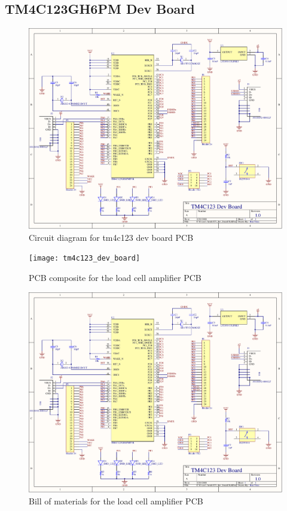 \begin{flushleft}
\section{TM4C123GH6PM Dev Board}
\end{flushleft}
\label{app:tm4c_dev_board}
\begin{figure}[H]
	\centering
	\includegraphics[page=1,scale=0.8,angle=270]{PDFs/tm4c123_dev_board.PDF}
	\caption{Circuit diagram for tm4c123 dev board PCB}
	\label{fig:tm4c123_dev_board_circuit}
\end{figure}
\begin{figure}[H]
	\centering
	\texttt{[image: tm4c123\_dev\_board]} 
	\caption{PCB composite for the load cell amplifier PCB}
	\label{fig:tm4c123_dev_board_pcb}
\end{figure}
\begin{figure}[H]
	\centering
	\includegraphics[page=3,width=\textwidth]{PDFs/tm4c123_dev_board.PDF} 
	\caption{Bill of materials for the load cell amplifier PCB}
	\label{fig:tm4c123_dev_board_bom}
\end{figure}